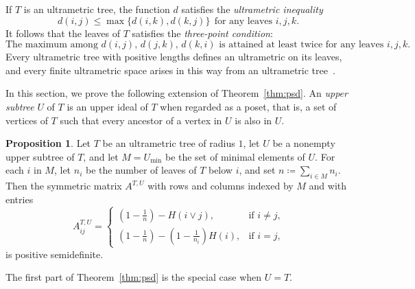 \documentclass{amsart}
\theoremstyle{definition}
\newtheorem{proposition}[theorem]{Proposition}
\theoremstyle{remark}
\newcommand{\1}{\mathbf{1}}
\numberwithin{equation}{section}
\begin{document}
If $T$ is an ultrametric tree, the function $d$ satisfies the
\emph{ultrametric inequality}
\[
d(i,j)\leq \max\Big\{d(i,k),d(k,j)\Big\} \ \ \text{for any leaves $i,j,k$.}
\]
 It follows that the leaves of $T$ satisfies the \emph{three-point condition}:
\[
  \text{The maximum among $d(i,j),\, d(j,k),\, d(k,i)$ is attained at least twice for any leaves $i,j,k$.}
  \]
Every ultrametric tree with positive lengths defines an ultrametric on its leaves, and every finite ultrametric space arises in this way from an ultrametric tree~\cite[Theorem 3.1]{BG91}.




In this section, we prove the following extension of Theorem~\ref{thm:psd}.  
An \textit{upper subtree} $U$ of $T$ is an upper ideal of $T$ when regarded as a poset, that is, a set of vertices of $T$ such that every ancestor of a vertex in $U$ is also in $U$.


\begin{proposition}\label{prop:psd_general}
	Let $T$ be an ultrametric tree of radius $1$, let $U$ be a nonempty upper subtree of $T$, and let $M=U_{\text{min}}$ be the set of minimal elements of $U$. For each $i$ in $M$, let $n_i$ be the number of leaves of $T$ below $i$, and set $n\coloneqq\sum_{i\in M} n_i$. Then the symmetric matrix $A^{T,U}$ with rows and columns indexed by $M$ and with entries
	\[
	A_{ij}^{T,U} = \begin{cases}
		(1-\frac{1}{n}) - H(i\vee j), &\text{if $i \neq j$,}\\
		(1-\frac{1}{n}) - (1-\frac{1}{n_i}) H(i), &\text{if $i=j$,}
	\end{cases}
	\]
	is positive semidefinite. 
\end{proposition}


The first part of Theorem~\ref{thm:psd} is the special case when $U=T$.
\end{document}
